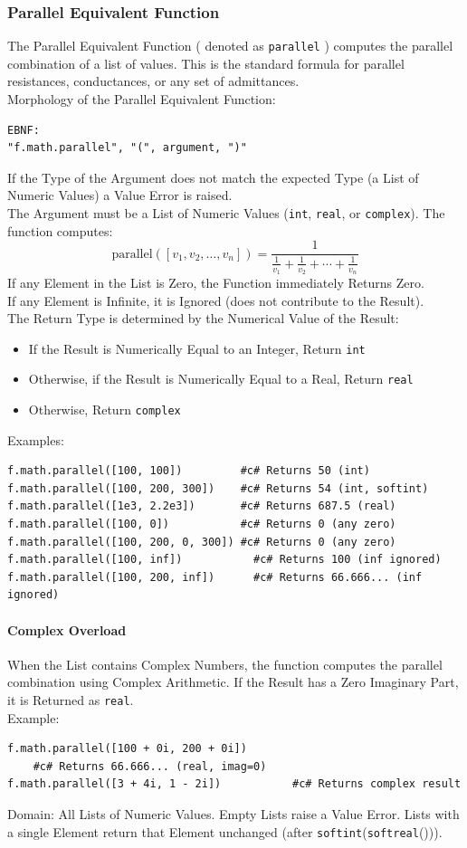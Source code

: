 \subsubsection{Parallel Equivalent Function}
The Parallel Equivalent Function ( denoted as \texttt{parallel} ) computes the parallel combination of a list of values. This is the standard formula for parallel resistances, conductances, or any set of admittances. \\
Morphology of the Parallel Equivalent Function:
\begin{verbatim}
EBNF:
"f.math.parallel", "(", argument, ")"
\end{verbatim}
If the Type of the Argument does not match the expected Type (a List of Numeric Values) a Value Error is raised.\\
The Argument must be a List of Numeric Values (\texttt{int}, \texttt{real}, or \texttt{complex}). The function computes:
\[
\text{parallel}([v_1, v_2, \ldots, v_n]) = \frac{1}{\frac{1}{v_1} + \frac{1}{v_2} + \cdots + \frac{1}{v_n}}
\]
If any Element in the List is Zero, the Function immediately Returns Zero.\\
If any Element is Infinite, it is Ignored (does not contribute to the Result).\\
The Return Type is determined by the Numerical Value of the Result:
\begin{itemize}
\item If the Result is Numerically Equal to an Integer, Return \texttt{int}
\item Otherwise, if the Result is Numerically Equal to a Real, Return \texttt{real}
\item Otherwise, Return \texttt{complex}
\end{itemize}
Examples:
\begin{verbatim}
f.math.parallel([100, 100])         #c# Returns 50 (int)
f.math.parallel([100, 200, 300])    #c# Returns 54 (int, softint)
f.math.parallel([1e3, 2.2e3])       #c# Returns 687.5 (real)
f.math.parallel([100, 0])           #c# Returns 0 (any zero)
f.math.parallel([100, 200, 0, 300]) #c# Returns 0 (any zero)
f.math.parallel([100, inf])           #c# Returns 100 (inf ignored)
f.math.parallel([100, 200, inf])      #c# Returns 66.666... (inf ignored)
\end{verbatim}

\paragraph{Complex Overload}
When the List contains Complex Numbers, the function computes the parallel combination using Complex Arithmetic. If the Result has a Zero Imaginary Part, it is Returned as \texttt{real}. \\
Example:
\begin{verbatim}
f.math.parallel([100 + 0i, 200 + 0i])
    #c# Returns 66.666... (real, imag=0)
f.math.parallel([3 + 4i, 1 - 2i])           #c# Returns complex result
\end{verbatim}
Domain: All Lists of Numeric Values. Empty Lists raise a Value Error. Lists with a single Element return that Element unchanged (after \texttt{softint}(\texttt{softreal}())).\\

